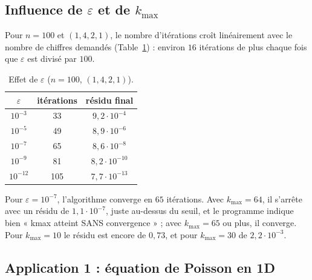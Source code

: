 \documentclass[a4paper]{scrartcl}
\begin{document}
\subsection{Influence de $\varepsilon$ et de $k_{\max}$}

Pour $n=100$ et $(1,4,2,1)$, le nombre d'itérations croît linéairement avec le nombre de chiffres demandés 
(Table~\ref{tbl:vareps}) : environ $16$ itérations de plus chaque fois que $\varepsilon$ est divisé par $100$.
\begin{table}[!ht]
\centering
\begin{tabular}{|c|c|c|}
\hline
$\varepsilon$ & itérations & résidu final \\ \hline
$10^{-3}$ & 33 & $9{,}2\cdot10^{-4}$ \\ \hline
$10^{-5}$ & 49 & $8{,}9\cdot10^{-6}$ \\ \hline
$10^{-7}$ & 65 & $8{,}6\cdot10^{-8}$ \\ \hline
$10^{-9}$ & 81 & $8{,}2\cdot10^{-10}$ \\ \hline
$10^{-12}$ & 105 & $7{,}7\cdot10^{-13}$ \\ \hline
\end{tabular}
\caption{Effet de $\varepsilon$ ($n=100$, $(1,4,2,1)$).}
\label{tbl:vareps}
\end{table}
Pour $\varepsilon=10^{-7}$, l'algorithme converge en $65$ itérations. Avec $k_{\max}=64$, il s'arrête avec un résidu de 
$1{,}1\cdot10^{-7}$, juste au-dessus du seuil, et le programme indique bien « kmax atteint SANS convergence » ; 
avec $k_{\max}=65$ ou plus, il converge. Pour $k_{\max}=10$ le résidu est encore de $0{,}73$, et pour $k_{\max}=30$ de 
$2{,}2\cdot10^{-3}$.

\subsection{Application 1 : équation de Poisson en 1D}
\end{document}
